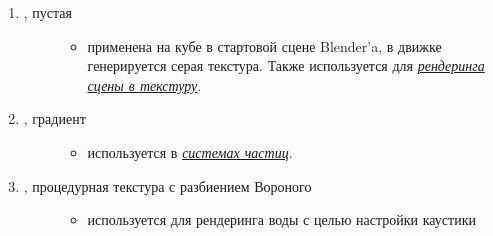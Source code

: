 \documentclass[a4paper,12pt,oneside]{sphinxmanual}
\begin{document}
\begin{enumerate}
\item {} \begin{description}
\item[{, пустая}] \leavevmode\begin{itemize}
\item {} 
применена на кубе в стартовой сцене Blender'a, в движке генерируется серая текстура. Также используется для {\hyperref[textures:render-to-texture]{\emph{рендеринга сцены в текстуру}}}.

\end{itemize}

\end{description}

\item {} \begin{description}
\item[{, градиент}] \leavevmode\begin{itemize}
\item {} 
используется в {\hyperref[particles:particles-textures]{\emph{системах частиц}}}.

\end{itemize}

\end{description}

\item {} \begin{description}
\item[{, процедурная текстура с разбиением Вороного}] \leavevmode\begin{itemize}
\item {} 
используется для рендеринга воды с целью настройки каустики

\end{itemize}

\end{description}

\end{enumerate}

\end{document}
